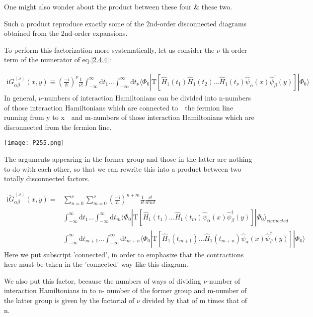 One might also wonder about the product between these four \& these two.

Such a product reproduce exactly some of the 2nd-order disconnected diagrams obtained from the 2nd-order expansions.

To perform this factorization more systematically, let us consider the $\nu$-th order term of the numerator of eq.\ref{2.4.4}:

\begin{align}
\mathrm{i}G_{\alpha\beta}^{(\nu)}(x,y)\equiv(\frac{-\mathrm{i}}{\hbar})^{\nu}\frac{1}{\nu!}\int_{-\infty}^{\infty}\mathrm{d}t_1...\int_{-\infty}^{\infty}\mathrm{d}t_{\nu}\langle\Phi_0|\mathrm{T}[\hat H_1(t_1)\hat H_1(t_2)...\hat H_1(t_{\nu})\hat \psi_{\alpha}(x)\hat \psi^{\dagger}_{\beta}(y)]|\Phi_0\rangle \nonumber
\end{align}
In general, $\nu$-numbers of interaction Hamiltonians can be divided into n-numbers of those interaction Hamiltonians which are connected to\ \ the fermion line running from y to x\ \ and m-numbers of those interaction Hamiltonians which are disconnected from the fermion line.
\begin{center}
\texttt{[image: P255.png]}
\end{center}
The arguments appearing in the former group and those in the latter are nothing to do with each other, so that we can rewrite this into a product between two totally disconnected factors.

\begin{align}
\mathrm{i}\tilde{G}_{\alpha\beta}^{(\nu)}(x,y)=& \sum_{n=0}^{\nu}\sum_{m=0}^{\nu}(\frac{-\mathrm{i}}{\hbar})^{n+m}\frac{1}{\nu!}\frac{\nu!}{n!m!} \nonumber \\
&\int_{-\infty}^{\infty}\mathrm{d}t_1...\int_{-\infty}^{\infty}\mathrm{d}t_{m}\langle\Phi_0|\mathrm{T}[\hat H_1(t_1)...\hat H_1(t_{m})\hat \psi_{\alpha}(x)\hat \psi^{\dagger}_{\beta}(y)]|\Phi_0\rangle_{connected} \nonumber \\
&\int_{-\infty}^{\infty}\mathrm{d}t_{m+1}...\int_{-\infty}^{\infty}\mathrm{d}t_{m+n}\langle\Phi_0|\mathrm{T}[\hat H_1(t_{m+1})...\hat H_1(t_{m+n})\hat \psi_{\alpha}(x)\hat \psi^{\dagger}_{\beta}(y)]|\Phi_0\rangle \nonumber 
\end{align}
Here we put subscript 'connected', in order to emphasize that the contractions here must be taken in the 'connected' way like this diagram.

We also put this factor, because the numbers of ways of dividing $\nu$-number of interaction Hamiltonians in to n- number of the former group and m-number of the latter group is given by the factorial of $\nu$ divided by that of m times that of n.

